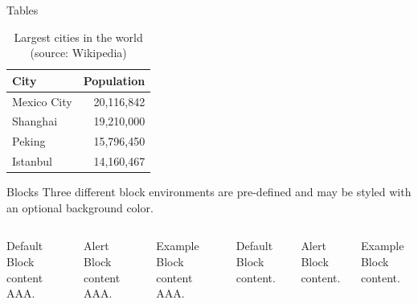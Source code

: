 \documentclass[10pt]{beamer}
\begin{document}
\begin{frame}{Tables}
  \begin{table}
    \caption{Largest cities in the world (source: Wikipedia)}
    \begin{tabular}{lr}
      \toprule
      City & Population\\
      \midrule
      Mexico City & 20,116,842\\
      Shanghai & 19,210,000\\
      Peking & 15,796,450\\
      Istanbul & 14,160,467\\
      \bottomrule
    \end{tabular}
  \end{table}
\end{frame}
\begin{frame}{Blocks}
  Three different block environments are pre-defined and may be styled with an
  optional background color.

  \begin{columns}[T,onlytextwidth]
      \begin{block}{Default}
        Block content AAA.
      \end{block}

      \begin{alertblock}{Alert}
        Block content AAA.
      \end{alertblock}

      \begin{exampleblock}{Example}
        Block content AAA.
      \end{exampleblock}



      \begin{block}{Default}
        Block content.
      \end{block}

      \begin{alertblock}{Alert}
        Block content.
      \end{alertblock}

      \begin{exampleblock}{Example}
        Block content.
      \end{exampleblock}

  \end{columns}
\end{frame}
\end{document}
